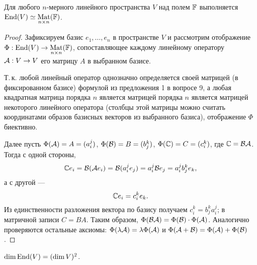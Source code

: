 \begin{theorem}
    Для любого $n$-мерного линейного пространства $V$ над полем $\mathbb{F}$ выполняется $\operatorname{End}(V) \simeq \underset{n \times n}{\operatorname{Mat}}(\mathbb{F})$.
\end{theorem}

\begin{proof}
    Зафиксируем базис $e_1, \ldots, e_n$ в пространстве $V$ и рассмотрим отображение $\Phi: \operatorname{End}(V) \to \underset{n \times n}{\operatorname{Mat}}(\mathbb{F})$, сопоставляющее каждому линейному оператору $\mathcal{A}: V \to V$ его матрицу $A$ в выбранном базисе.

    Т.\,к. любой линейный оператор однозначно определяется своей матрицей (в фиксированном базисе) формулой из предложения 1 в вопросе 9, а любая квадратная матрица порядка $n$ является матрицей порядка $n$ является матрицей некоторого линейного оператора (столбцы этой матрицы можно считать координатами образов базисных векторов из выбранного базиса), отображение $\Phi$ биективно.

    Далее пусть $\Phi(\mathcal{A}) = A = (a^j_i)$, $\Phi(\mathcal{B}) = B = (b^k_j)$, $\Phi(\C) = C = (c^k_i)$, где $\C = \B\A$. Тогда с одной стороны,
    \[
        \C e_i = \B(\A e_i) = \B(a^j_ie_j) = a^j_i\B e_j = a^j_ib^k_je_k,
    \]
    а с другой ---
    \[
        \C e_i = c^k_ie_k.
    \]
    Из единственности разложения вектора по базису получаем $c^k_i = b^k_ja^j_i$; в матричной записи $C = BA$. Таким образом, $\Phi(\mathcal{B}\mathcal{A}) = \Phi(\mathcal{B}) \cdot \Phi(\mathcal{A})$. Аналогично проверяются остальные аксиомы: $\Phi(\lambda\mathcal{A}) = \lambda\Phi(\mathcal{A})$ и $\Phi(\mathcal{A} + \mathcal{B}) = \Phi(\mathcal{A}) + \Phi(\mathcal{B})$.
\end{proof}

\begin{corollary}
    $\dim\operatorname{End}(V) = (\dim V)^2$.
\end{corollary}

\renewcommand{\C}{\mathbb{C}}

